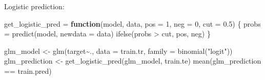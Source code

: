 \documentclass[
]{article}
\newenvironment{Shaded}{\begin{snugshade}}{\end{snugshade}}
\newcommand{\AttributeTok}[1]{\textcolor[rgb]{0.77,0.63,0.00}{#1}}
\newcommand{\ControlFlowTok}[1]{\textcolor[rgb]{0.13,0.29,0.53}{\textbf{#1}}}
\newcommand{\DecValTok}[1]{\textcolor[rgb]{0.00,0.00,0.81}{#1}}
\newcommand{\FloatTok}[1]{\textcolor[rgb]{0.00,0.00,0.81}{#1}}
\newcommand{\FunctionTok}[1]{\textcolor[rgb]{0.00,0.00,0.00}{#1}}
\newcommand{\NormalTok}[1]{#1}
\newcommand{\OtherTok}[1]{\textcolor[rgb]{0.56,0.35,0.01}{#1}}
\newcommand{\SpecialCharTok}[1]{\textcolor[rgb]{0.00,0.00,0.00}{#1}}
\newcommand{\StringTok}[1]{\textcolor[rgb]{0.31,0.60,0.02}{#1}}
\begin{document}
\begin{Shaded}
\end{Shaded}

Logistic prediction:

\begin{Shaded}
\begin{Highlighting}[]
\NormalTok{get\_logistic\_pred }\OtherTok{=} \ControlFlowTok{function}\NormalTok{(model, data, }\AttributeTok{pos =} \DecValTok{1}\NormalTok{, }\AttributeTok{neg =} \DecValTok{0}\NormalTok{, }\AttributeTok{cut =} \FloatTok{0.5}\NormalTok{) \{}
\NormalTok{  probs }\OtherTok{=} \FunctionTok{predict}\NormalTok{(model, }\AttributeTok{newdata =}\NormalTok{ data)}
  \FunctionTok{ifelse}\NormalTok{(probs }\SpecialCharTok{\textgreater{}}\NormalTok{ cut, pos, neg)}
\NormalTok{\}}
\end{Highlighting}
\end{Shaded}

\begin{Shaded}
\begin{Highlighting}[]
\NormalTok{glm\_model }\OtherTok{\textless{}{-}} \FunctionTok{glm}\NormalTok{(target}\SpecialCharTok{\textasciitilde{}}\NormalTok{., }\AttributeTok{data =}\NormalTok{ train.tr, }\AttributeTok{family =} \FunctionTok{binomial}\NormalTok{(}\StringTok{"logit"}\NormalTok{))}
\NormalTok{glm\_prediction }\OtherTok{\textless{}{-}} \FunctionTok{get\_logistic\_pred}\NormalTok{(glm\_model, train.te)}
\FunctionTok{mean}\NormalTok{(glm\_prediction }\SpecialCharTok{==}\NormalTok{ train.pred)}
\end{Highlighting}
\end{Shaded}
\end{document}
